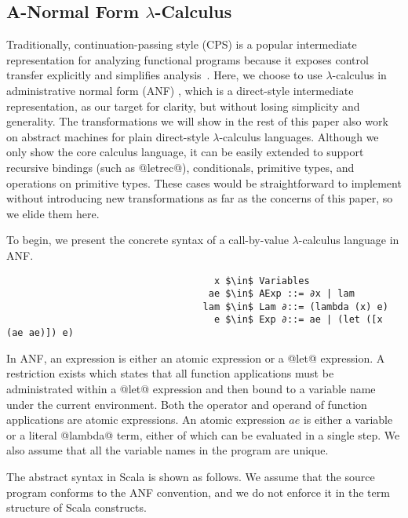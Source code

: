 \documentclass[acmsmall, review]{acmart}\settopmatter{}
\begin{document}
\subsection{A-Normal Form $\lambda$-Calculus} \label{anfsyntax}

Traditionally, continuation-passing style (CPS) is a popular intermediate representation
for analyzing functional programs because it exposes control transfer explicitly and 
simplifies analysis~\cite{Shivers:1991:SSC:115865.115884, Shivers:1988:CFA:53990.54007}.
Here, we choose to use $\lambda$-calculus in administrative normal form (ANF)
\cite{flanagan1993essence}, which is a direct-style intermediate representation, as our 
target for clarity, but without losing simplicity and generality. The transformations 
we will show in the rest of this paper also work on abstract machines for plain 
direct-style $\lambda$-calculus languages. Although we only show the core calculus language,
it can be easily extended to support recursive bindings (such as @letrec@), conditionals, 
primitive types, and operations on primitive types. These cases would be straightforward to
implement without introducing new transformations as far as the concerns of this paper,
so we elide them here.

To begin, we present the concrete syntax of a call-by-value $\lambda$-calculus language
in ANF.

\begin{lstlisting}
                                     x $\in$ Variables
                                    ae $\in$ AExp ::= ∂x | lam
                                   lam $\in$ Lam ∂::= (lambda (x) e)
                                     e $\in$ Exp ∂::= ae | (let ([x (ae ae)]) e)
\end{lstlisting}

In ANF, an expression is either an atomic expression or a @let@ expression.
A restriction exists which states that all function applications must be administrated
within a @let@ expression and then bound to a variable name under the current environment.
Both the operator and operand of function applications are atomic expressions.
An atomic expression $ae$ is either a variable or a literal @lambda@ term, either of which
can be evaluated in a single step. We also assume that all the variable names in the program
 are unique.

The abstract syntax in Scala is shown as follows. We assume that the source program conforms
to the ANF convention, and we do not enforce it in the term structure of Scala constructs.
\end{document}
